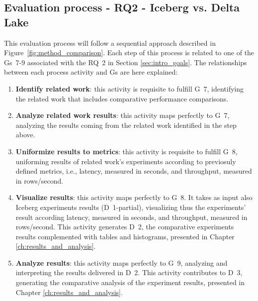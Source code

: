 \subsection{Evaluation process - RQ2 - Iceberg vs. Delta Lake}
\label{subsec:ystem_eval_iceberg_delta}
This evaluation process will follow a sequential approach described in Figure~\ref{fig:method_comparison}. Each step of this process is related to one of the \glspl{G}~7-9 associated with the \gls{RQ}~2 in Section \ref{sec:intro_goals}. The relationships between each process activity and \glspl{G} are here explained:
\begin{enumerate}
    \item \textbf{Identify related work}: this activity is requisite to fulfill \gls{G}~7, identifying the related work that includes comparative performance comparisons.
    \item \textbf{Analyze related work results}: this activity maps perfectly to \gls{G}~7, analyzing the results coming from the related work identified in the step above.
    \item \textbf{Uniformize results to metrics}: this activity is requisite to fulfill \gls{G}~8, uniforming results of related work's experiments according to previosuly defined metrics, i.e., latency, measured in seconds, and throughput, measured  in rows/second.
    \item \textbf{Visualize results}: this activity maps perfectly to \gls{G}~8. It takes as input also Iceberg experiments results (\gls{D}~1-partial), visualizing thus the experiments' result according latency, measured in seconds, and throughput, measured in rows/second. This activity generates \gls{D}~2, the comparative experiments results complemented with tables and histograms, presented in Chapter \ref{ch:results_and_analysis}.
    \item \textbf{Analyze results}: this activity maps perfectly to \gls{G}~9, analyzing and interpreting the results delivered in \gls{D}~2. This activity contributes to \gls{D}~3, generating the comparative analysis of the experiment results, presented in Chapter \ref{ch:results_and_analysis}.
\end{enumerate}
